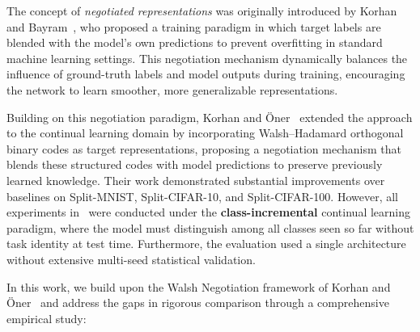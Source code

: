 \documentclass[preprint,review,12pt]{elsarticle}
\begin{document}
The concept of \emph{negotiated representations} was originally introduced by Korhan and Bayram~\cite{korhan2023negotiation_paradigm}, who proposed a training paradigm in which target labels are blended with the model's own predictions to prevent overfitting in standard machine learning settings. This negotiation mechanism dynamically balances the influence of ground-truth labels and model outputs during training, encouraging the network to learn smoother, more generalizable representations.

Building on this negotiation paradigm, Korhan and {\"O}ner~\cite{korhan2023negotiated} extended the approach to the continual learning domain by incorporating Walsh--Hadamard orthogonal binary codes as target representations, proposing a negotiation mechanism that blends these structured codes with model predictions to preserve previously learned knowledge. Their work demonstrated substantial improvements over baselines on Split-MNIST, Split-CIFAR-10, and Split-CIFAR-100. However, all experiments in~\cite{korhan2023negotiated} were conducted under the \textbf{class-incremental} continual learning paradigm, where the model must distinguish among all classes seen so far without task identity at test time. Furthermore, the evaluation used a single architecture without extensive multi-seed statistical validation.

In this work, we build upon the Walsh Negotiation framework of Korhan and {\"O}ner~\cite{korhan2023negotiated} and address the gaps in rigorous comparison through a comprehensive empirical study:
\end{document}

